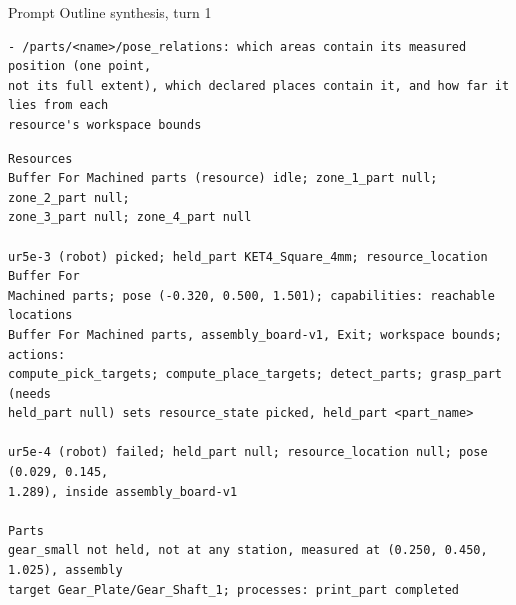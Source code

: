 \documentclass[preprint,12pt,authoryear]{elsarticle}
\begin{document}
\begin{recordbox}[breakable]{Prompt \enspace Outline synthesis, turn 1}
\begin{lstlisting}[style=recorded]
- /parts/<name>/pose_relations: which areas contain its measured position (one point,
not its full extent), which declared places contain it, and how far it lies from each
resource's workspace bounds
\end{lstlisting}
\medskip
\begin{lstlisting}[style=recorded]
Resources
Buffer For Machined parts (resource) idle; zone_1_part null; zone_2_part null;
zone_3_part null; zone_4_part null

ur5e-3 (robot) picked; held_part KET4_Square_4mm; resource_location Buffer For
Machined parts; pose (-0.320, 0.500, 1.501); capabilities: reachable locations
Buffer For Machined parts, assembly_board-v1, Exit; workspace bounds; actions:
compute_pick_targets; compute_place_targets; detect_parts; grasp_part (needs
held_part null) sets resource_state picked, held_part <part_name>

ur5e-4 (robot) failed; held_part null; resource_location null; pose (0.029, 0.145,
1.289), inside assembly_board-v1

Parts
gear_small not held, not at any station, measured at (0.250, 0.450, 1.025), assembly
target Gear_Plate/Gear_Shaft_1; processes: print_part completed
\end{lstlisting}
\end{recordbox}
\end{document}
